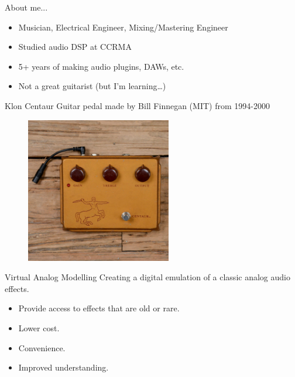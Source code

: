 \begin{frame}{About me...}
    \vspace{1ex}
    \begin{itemize}
        \itemsep0.5em
        \item Musician, Electrical Engineer, Mixing/Mastering Engineer
        \item Studied audio DSP at CCRMA
        \item 5+ years of making audio plugins, DAWs, etc.
        \item Not a great guitarist (but I'm learning\dots)
    \end{itemize}
\end{frame}

\begin{frame}{Klon Centaur}
    Guitar pedal made by Bill Finnegan (MIT) from 1994-2000
    \vspace{1ex}
    \begin{figure}
        \centering
        \includegraphics[height=2.5in]{../Paper/Figures/KlonCentaur.jpg}
    \end{figure}
\end{frame}

\begin{frame}{Virtual Analog Modelling}
    Creating a digital emulation of a classic analog audio effects.
    \vspace{1ex}
    \begin{itemize}
        \itemsep0.5em
        \item Provide access to effects that are old or rare.
        \item Lower cost.
        \item Convenience.
        \item Improved understanding.
    \end{itemize}
\end{frame}

